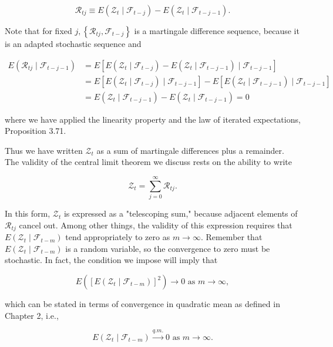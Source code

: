 \documentclass[10pt]{article}
\begin{document}
$$
\mathcal{R}_{t j} \equiv E\left(\mathcal{Z}_{t} \mid \mathcal{F}_{t-j}\right)-E\left(\mathcal{Z}_{t} \mid \mathcal{F}_{t-j-1}\right) .
$$

Note that for fixed $j,\left\{\mathcal{R}_{t j}, \mathcal{F}_{t-j}\right\}$ is a martingale difference sequence, because it is an adapted stochastic sequence and

$$
\begin{aligned}
E\left(\mathcal{R}_{t j} \mid \mathcal{F}_{t-j-1}\right) & =E\left[E\left(\mathcal{Z}_{t} \mid \mathcal{F}_{t-j}\right)-E\left(\mathcal{Z}_{t} \mid \mathcal{F}_{t-j-1}\right) \mid \mathcal{F}_{t-j-1}\right] \\
& =E\left[E\left(\mathcal{Z}_{t} \mid \mathcal{F}_{t-j}\right) \mid \mathcal{F}_{t-j-1}\right]-E\left[E\left(\mathcal{Z}_{t} \mid \mathcal{F}_{t-j-1}\right) \mid \mathcal{F}_{t-j-1}\right] \\
& =E\left(\mathcal{Z}_{t} \mid \mathcal{F}_{t-j-1}\right)-E\left(\mathcal{Z}_{t} \mid \mathcal{F}_{t-j-1}\right)=0
\end{aligned}
$$

where we have applied the linearity property and the law of iterated expectations, Proposition 3.71.

Thus we have written $\mathcal{Z}_{t}$ as a sum of martingale differences plus a remainder. The validity of the central limit theorem we discuss rests on the ability to write

$$
\mathcal{Z}_{t}=\sum_{j=0}^{\infty} \mathcal{R}_{t j} .
$$

In this form, $\mathcal{Z}_{t}$ is expressed as a "telescoping sum," because adjacent elements of $\mathcal{R}_{t j}$ cancel out. Among other things, the validity of this expression requires that $E\left(\mathcal{Z}_{t} \mid \mathcal{F}_{t-m}\right)$ tend appropriately to zero as $m \rightarrow \infty$. Remember that $E\left(\mathcal{Z}_{t} \mid \mathcal{F}_{t-m}\right)$ is a random variable, so the convergence to zero must be stochastic. In fact, the condition we impose will imply that

$$
E\left(\left[E\left(\mathcal{Z}_{t} \mid \mathcal{F}_{t-m}\right)\right]^{2}\right) \rightarrow 0 \text { as } m \rightarrow \infty,
$$

which can be stated in terms of convergence in quadratic mean as defined in Chapter 2, i.e.,

$$
E\left(\mathcal{Z}_{t} \mid \mathcal{F}_{t-m}\right) \xrightarrow{q . m .} 0 \text { as } m \rightarrow \infty .
$$
\end{document}

